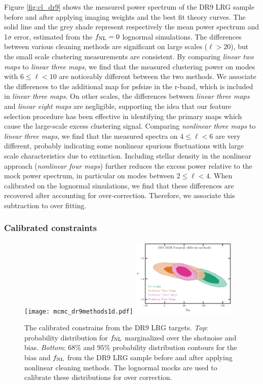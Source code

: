 Figure \ref{fig:cl_dr9} shows the measured power spectrum of the DR9 LRG sample before and after applying imaging weights and the best fit theory curves. The solid line and the grey shade represent respectively the mean power spectrum and 1$\sigma$ error, estimated from the $f_{\rm NL}=0$ lognormal simulations. The differences between various cleaning methods are significant on large scales ($\ell > 20$), but the small scale clustering measurements are consistent. By comparing \textit{linear two maps} to \textit{linear three maps}, we find that the measured clustering power on modes with $6\leq \ell < 10$ are noticeably different between the two methods. We associate the differences to the additional map for psfsize in the r-band, which is included in \textit{linear three maps}. On other scales, the differences between \textit{linear three maps} and \textit{linear eight maps} are negligible, supporting the idea that our feature selection procedure has been effective in identifying the primary maps which cause the large-scale excess clustering signal. Comparing \textit{nonlinear three maps} to \textit{linear three maps}, we find that the measured spectra on $4 \leq \ell < 6$ are very different, probably indicating some nonlinear spurious fluctuations with large scale characteristics due to extinction. Including stellar density in the nonlinear approach (\textit{nonlinear four maps}) further reduces the excess power relative to the mock power spectrum, in particular on modes between $2\leq \ell < 4$. When calibrated on the lognormal simulations, we find that these differences are recovered after accounting for over-correction. Therefore, we associate this subtraction to over fitting.


\subsubsection{Calibrated constraints}

\begin{figure}
    \raggedleft
    \texttt{[image: mcmc\_dr9methods1d.pdf]}
    \includegraphics[width=0.45\textwidth]{figures/mcmc_dr9methods.pdf} 
    \caption{The calibrated constrains from the DR9 LRG targets. \textit{Top}: probability distribution for $f_{\rm NL}$ marginalized over the shotnoise and bias. \textit{Bottom}: $68\%$ and $95\%$ probability distribution contours for the bias and $f_{\rm NL}$ from the DR9 LRG sample before and after applying nonlinear cleaning methods. The lognormal mocks are used to calibrate these distributions for over correction.}\label{fig:mcmc_dr9}
\end{figure}

